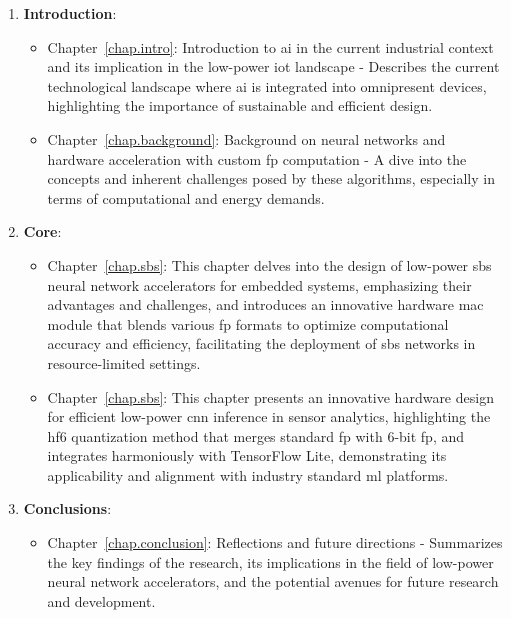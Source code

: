 \begin{enumerate}[I]
	\item \textbf{Introduction}: 
	\begin{itemize}
		\item Chapter~\ref{chap.intro}: Introduction to \gls{ai} in the current industrial context and its implication in the low-power \gls{iot} landscape - Describes the current technological landscape where \gls{ai} is integrated into omnipresent devices, highlighting the importance of sustainable and efficient design.
		\item Chapter~\ref{chap.background}: Background on neural networks and hardware acceleration with custom \gls{fp} computation - A dive into the concepts and inherent challenges posed by these algorithms, especially in terms of computational and energy demands.
	\end{itemize}
	
	\item \textbf{Core}: 
	\begin{itemize}
		\item Chapter~\ref{chap.sbs}: This chapter delves into the design of low-power \gls{sbs} neural network accelerators for embedded systems, emphasizing their advantages and challenges, and introduces an innovative hardware \gls{mac} module that blends various \gls{fp} formats to optimize computational accuracy and efficiency, facilitating the deployment of \gls{sbs} networks in resource-limited settings.
		\item Chapter~\ref{chap.sbs}: This chapter presents an innovative hardware design for efficient low-power \gls{cnn} inference in sensor analytics, highlighting the \gls{hf6} quantization method that merges standard \gls{fp} with 6-bit \gls{fp}, and integrates harmoniously with TensorFlow Lite, demonstrating its applicability and alignment with industry standard \gls{ml} platforms.
	\end{itemize}
	
	\item \textbf{Conclusions}: 
	\begin{itemize}
		\item Chapter~\ref{chap.conclusion}: Reflections and future directions - Summarizes the key findings of the research, its implications in the field of low-power neural network accelerators, and the potential avenues for future research and development.
	\end{itemize}
\end{enumerate}
